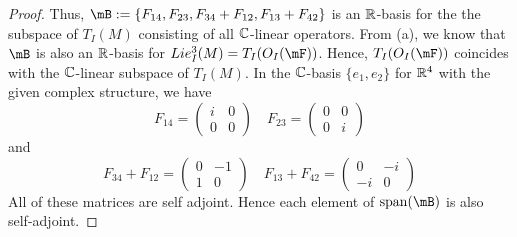 \documentclass{article}
\begin{document}
\begin{proof}
Thus, $\mB := \{F_{14}, F_{23},  F_{34} + F_{12}, F_{13} + F_{42} \}$ is an $\mathbb{R}$-basis for the the subspace of $T_I(M)$ consisting of all $\mathbb{C}$-linear operators. From (a), we know that $\mB$ is also an $\mathbb{R}$-basis for $Lie_I^3(M) = T_I(O_I(\mF))$.  Hence, $T_I(O_I(\mF))$ coincides with the $\mathbb{C}$-linear subspace of $T_I(M)$.  In the $\mathbb{C}$-basis $\{e_1, e_2\}$ for $\mathbb{R}^4$ with the given complex structure, we have
\[
F_{14} = \begin{pmatrix}
i &  0 
\\ 0 & 0
\end{pmatrix}
\quad
F_{23} = \begin{pmatrix}
0 &  0 
\\ 0 & i
\end{pmatrix}
\]
and
\[
F_{34} + F_{12} = \begin{pmatrix}
0 &  -1 
\\ 1 & 0
\end{pmatrix}
\quad
F_{13} + F_{42} = \begin{pmatrix}
0 &  -i 
\\ -i & 0
\end{pmatrix}
\]
All of these matrices are self adjoint.   Hence each element of $\spn(\mB)$ is also self-adjoint.
\end{proof}
\end{document}
